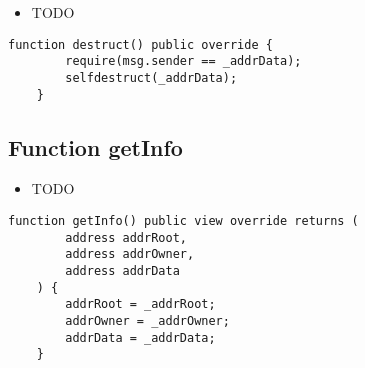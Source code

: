 \begin{itemize}
\item TODO
\end{itemize}

\begin{lstlisting}[firstnumber=39]
    function destruct() public override {
        require(msg.sender == _addrData);
        selfdestruct(_addrData);
    }
\end{lstlisting}

\subsection{Function getInfo}

\begin{itemize}
\item TODO
\end{itemize}

\begin{lstlisting}[firstnumber=29]
    function getInfo() public view override returns (
        address addrRoot,
        address addrOwner,
        address addrData
    ) {
        addrRoot = _addrRoot;
        addrOwner = _addrOwner;
        addrData = _addrData;
    }
\end{lstlisting}
